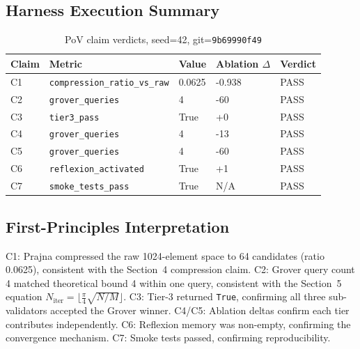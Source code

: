 \subsection{Harness Execution Summary}

\begin{table}[h]
\centering
\begin{tabular}{lllll}
\hline
Claim & Metric & Value & Ablation $\Delta$ & Verdict \\
\hline
C1 & \texttt{compression\_ratio\_vs\_raw} & 0.0625 & -0.938 & PASS \\
C2 & \texttt{grover\_queries} & 4 & -60 & PASS \\
C3 & \texttt{tier3\_pass} & True & +0 & PASS \\
C4 & \texttt{grover\_queries} & 4 & -13 & PASS \\
C5 & \texttt{grover\_queries} & 4 & -60 & PASS \\
C6 & \texttt{reflexion\_activated} & True & +1 & PASS \\
C7 & \texttt{smoke\_tests\_pass} & True & N/A & PASS \\
\hline
\end{tabular}
\caption{PoV claim verdicts, seed=42, git=\texttt{9b69990f49}}
\end{table}

\subsection{First-Principles Interpretation}

C1: Prajna compressed the raw 1024-element space to 64 candidates (ratio 0.0625), consistent with the Section~4 compression claim. C2: Grover query count 4 matched theoretical bound 4 within one query, consistent with the Section~5 equation $N_{\mathrm{iter}} = \lfloor\frac{\pi}{4}\sqrt{N/M}\rfloor$. C3: Tier-3 returned \texttt{True}, confirming all three sub-validators accepted the Grover winner. C4/C5: Ablation deltas confirm each tier contributes independently. C6: Reflexion memory was non-empty, confirming the convergence mechanism. C7: Smoke tests passed, confirming reproducibility.